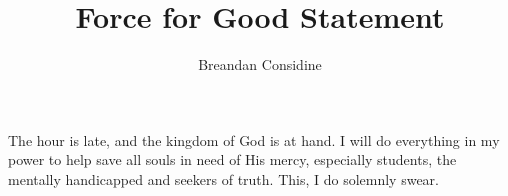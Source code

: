 \documentclass[11pt]{article}
\title{Force for Good Statement}
\author{Breandan Considine}
\begin{document}
\maketitle

The hour is late, and the kingdom of God is at hand. I will do everything in my power to help save all souls in need of His mercy, especially students, the mentally handicapped and seekers of truth. This, I do solemnly swear.
\end{document}
